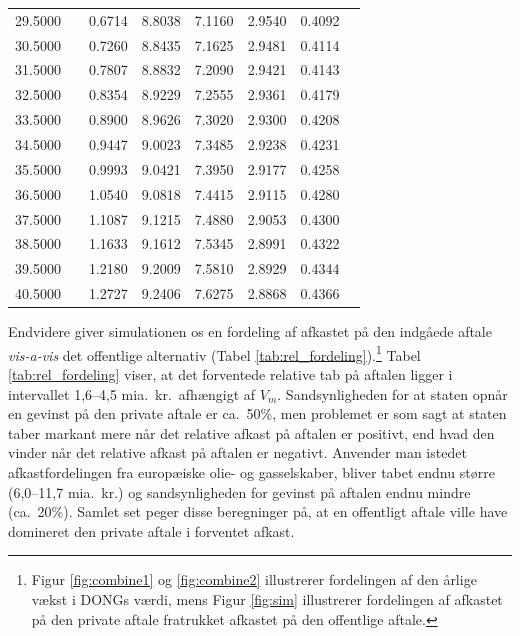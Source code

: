 \documentclass{article}
\begin{document}
\begin{table}[h]
\begin{tabularx}{0.95\linewidth}{cXcccccr}
 29.5000&&0.6714&8.8038&7.1160&2.9540&0.4092\\
 30.5000&&0.7260&8.8435&7.1625&2.9481&0.4114\\
 31.5000&&0.7807&8.8832&7.2090&2.9421&0.4143\\
 32.5000&&0.8354&8.9229&7.2555&2.9361&0.4179\\
 33.5000&&0.8900&8.9626&7.3020&2.9300&0.4208\\
 34.5000&&0.9447&9.0023&7.3485&2.9238&0.4231\\
 35.5000&&0.9993&9.0421&7.3950&2.9177&0.4258\\
 36.5000&&1.0540&9.0818&7.4415&2.9115&0.4280\\
 37.5000&&1.1087&9.1215&7.4880&2.9053&0.4300\\
 38.5000&&1.1633&9.1612&7.5345&2.8991&0.4322\\
 39.5000&&1.2180&9.2009&7.5810&2.8929&0.4344\\
 40.5000&&1.2727&9.2406&7.6275&2.8868&0.4366\\

\bottomrule[1pt]
	\end{tabularx}
	\begin{minipage}{\linewidth}
	\end{minipage}
\end{table}


Endvidere giver simulationen os en fordeling af afkastet på den indgåede aftale \emph{vis-a-vis} det offentlige alternativ (Tabel \ref{tab:rel_fordeling}).\footnote{Figur \ref{fig:combine1} og \ref{fig:combine2} illustrerer fordelingen af den årlige vækst i DONGs værdi, mens Figur \ref{fig:sim} illustrerer fordelingen af afkastet på den private aftale fratrukket afkastet på den offentlige aftale.} Tabel \ref{tab:rel_fordeling} viser, at det forventede relative tab på aftalen ligger i intervallet 1,6--4,5 mia.\ kr.\ afhængigt af $V_m$. Sandsynligheden for at staten opnår en gevinst på den private aftale er ca.\ 50\%, men problemet er som sagt at staten taber markant mere når det relative afkast på aftalen er positivt, end hvad den vinder når det relative afkast på aftalen er negativt. Anvender man istedet afkastfordelingen fra europæiske olie- og gasselskaber, bliver tabet endnu større (6,0--11,7 mia.\ kr.) og sandsynligheden for gevinst på aftalen endnu mindre (ca.\ 20\%). Samlet set peger disse beregninger på, at en offentligt aftale ville have domineret den private aftale i forventet afkast.
\end{document}
